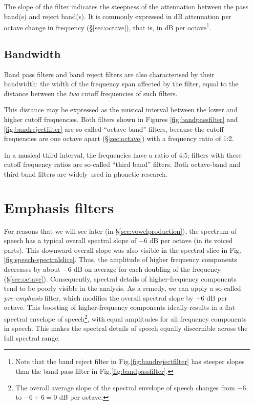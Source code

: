 \documentclass[
]{book}
\begin{document}
The slope of the filter indicates the steepness of the attenuation between the pass band(s) and reject band(s). It is commonly expressed in dB attenuation per octave change in frequency (§\ref{sec:octave}), that is, in dB per octave\footnote{Note that the band reject filter in Fig.\ref{fig:bandrejectfilter} has steeper slopes than the band pass filter in Fig.\ref{fig:bandpassfilter}.}.

\subsection{Bandwidth}\label{sec:filterbandwidth}

Band pass filters and band reject filters are also characterised by their bandwidth: the width of the frequency span affected by the filter, equal to the distance between the \emph{two} cutoff frequencies of such filters.

This distance may be expressed as the musical interval between the lower and higher cutoff frequencies. Both filters shown in Figures \ref{fig:bandpassfilter} and \ref{fig:bandrejectfilter} are so-called ``octave band'' filters, because the cutoff frequencies are one octave apart (§\ref{sec:octave}) with a frequency ratio of 1:2.

In a musical third interval, the frequencies have a ratio of 4:5; filters with these cutoff frequency ratios are so-called ``third band'' filters. Both octave-band and third-band filters are widely used in phonetic research.

\section{Emphasis filters}\label{sec:emphasisfilters}

For reasons that we will see later (in §\ref{sec:vowelproduction}), the spectrum of speech has a typical overall spectral slope of \(-6\) dB per octave (in its voiced parts). This downward overall slope was also visible in the spectral slice in Fig.\ref{fig:speech-spectralslice}. Thus, the amplitude of higher frequency components decreases by about \(-6\) dB on average for each doubling of the frequency (§\ref{sec:octave}).
Consequently, spectral details of higher-frequency components tend to be poorly visible in the analysis. As a remedy, we can apply a so-called \emph{pre-emphasis} filter, which modifies the overall spectral slope by \(+6\) dB per octave. This boosting of higher-frequency components ideally results in a flat spectral envelope of speech\footnote{The overall average slope of the spectral envelope of speech changes from \(-6\) to \(-6+6=0\) dB per octave.}, with equal amplitudes for all frequency components in speech. This makes the spectral details of speech equally discernible across the full spectral range.
\end{document}
